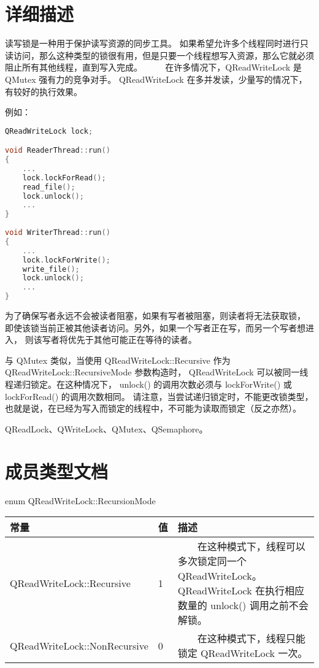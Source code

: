 \section{详细描述}

读写锁是一种用于保护读写资源的同步工具。
如果希望允许多个线程同时进行只读访问，那么这种类型的锁很有用，但是只要一个线程想写入资源，那么它就必须阻止所有其他线程，直到写入完成。
  
在许多情况下，QReadWriteLock 是 QMutex 强有力的竞争对手。
QReadWriteLock 在多并发读，少量写的情况下，有较好的执行效果。

例如：

\begin{lstlisting}[language=C++]
QReadWriteLock lock;

void ReaderThread::run()
{
    ...
    lock.lockForRead();
    read_file();
    lock.unlock();
    ...
}
    
void WriterThread::run()
{
    ...
    lock.lockForWrite();
    write_file();
    lock.unlock();
    ...
}
\end{lstlisting}

为了确保写者永远不会被读者阻塞，如果有写者被阻塞，则读者将无法获取锁，
即使该锁当前正被其他读者访问。另外，如果一个写者正在写，而另一个写者想进入，
则该写者将优先于其他可能正在等待的读者。

与 QMutex 类似，当使用 QReadWriteLock::Recursive 作为 QReadWriteLock::RecursiveMode 参数构造时，
QReadWriteLock 可以被同一线程递归锁定。在这种情况下，
unlock() 的调用次数必须与 lockForWrite() 或 lockForRead() 的调用次数相同。
请注意，当尝试递归锁定时，不能更改锁类型，也就是说，在已经为写入而锁定的线程中，不可能为读取而锁定（反之亦然）。

\begin{seeAlso}
QReadLock、QWriteLock、QMutex、QSemaphore。
\end{seeAlso}

\section{成员类型文档}

enum QReadWriteLock::RecursionMode

\begin{tabular}{|l|l|l|}
\hline
常量 &	值  &	描述 \\ 
\hline
QReadWriteLock::Recursive  &	1  &	  在这种模式下，线程可以多次锁定同一个 QReadWriteLock。QReadWriteLock 在执行相应数量的 unlock() 调用之前不会解锁。 \\ 
\hline
QReadWriteLock::NonRecursive &	0 	&  在这种模式下，线程只能锁定 QReadWriteLock 一次。 \\ 
\hline
\end{tabular}

